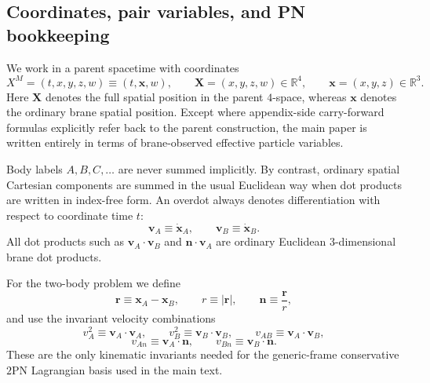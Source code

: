 \documentclass[11pt]{article}
\newcommand{\R}{\mathbb R}
\newcommand{\X}{\mathbf X}
\newcommand{\x}{\mathbf x}
\newcommand{\vct}{\mathbf v}
\newcommand{\nvec}{\mathbf n}
\newcommand{\TwoPN}{\mathrm{2PN}}
\begin{document}
\subsection{Coordinates, pair variables, and PN bookkeeping}
\label{app:notation-bookkeeping}

We work in a parent spacetime with coordinates
\begin{equation}
X^M=(t,x,y,z,w)\equiv (t,\x,w),
\qquad
\X=(x,y,z,w)\in\R^4,
\qquad
\x=(x,y,z)\in\R^3.
\label{eq:notation-2pn-coordinates}
\end{equation}
Here \(\X\) denotes the full spatial position in the parent \(4\)-space, whereas
\(\x\) denotes the ordinary brane spatial position.  Except where appendix-side
carry-forward formulas explicitly refer back to the parent construction, the main paper is
written entirely in terms of brane-observed effective particle variables.

Body labels \(A,B,C,\dots\) are never summed implicitly.  By contrast, ordinary spatial
Cartesian components are summed in the usual Euclidean way when dot products are written in
index-free form.  An overdot always denotes differentiation with respect to coordinate time
\(t\):
\begin{equation}
\vct_A\equiv \dot{\mathbf x}_A,
\qquad
\vct_B\equiv \dot{\mathbf x}_B.
\label{eq:notation-2pn-dots}
\end{equation}
All dot products such as \(\vct_A\!\cdot\!\vct_B\) and
\(\nvec\!\cdot\!\vct_A\) are ordinary Euclidean \(3\)-dimensional brane dot products.

For the two-body problem we define
\begin{equation}
\mathbf r\equiv \mathbf x_A-\mathbf x_B,
\qquad
r\equiv |\mathbf r|,
\qquad
\nvec\equiv \frac{\mathbf r}{r},
\label{eq:notation-2pn-rn}
\end{equation}
and use the invariant velocity combinations
\begin{equation}
v_A^2\equiv \vct_A\!\cdot\!\vct_A,
\qquad
v_B^2\equiv \vct_B\!\cdot\!\vct_B,
\qquad
v_{AB}\equiv \vct_A\!\cdot\!\vct_B,
\label{eq:notation-2pn-velocity-invariants-1}
\end{equation}
\begin{equation}
v_{An}\equiv \vct_A\!\cdot\!\nvec,
\qquad
v_{Bn}\equiv \vct_B\!\cdot\!\nvec.
\label{eq:notation-2pn-velocity-invariants-2}
\end{equation}
These are the only kinematic invariants needed for the generic-frame conservative
\(\TwoPN\) Lagrangian basis used in the main text.
\end{document}
